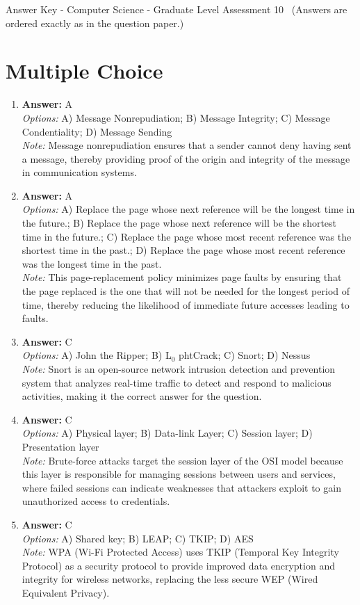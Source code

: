 \documentclass[12pt]{article}
\begin{document}
\begin{center}
Answer Key - Computer Science - Graduate Level Assessment 10 \
\small (Answers are ordered exactly as in the question paper.)
\end{center}

\section*{Multiple Choice}
\begin{enumerate}[label=\arabic*.]
\item \textbf{Answer:} A
\\ \textit{Options:} A) Message Nonrepudiation; B) Message Integrity; C) Message Condentiality; D) Message Sending
\\ \textit{Note:} Message nonrepudiation ensures that a sender cannot deny having sent a message, thereby providing proof of the origin and integrity of the message in communication systems.
\item \textbf{Answer:} A
\\ \textit{Options:} A) Replace the page whose next reference will be the longest time in the future.; B) Replace the page whose next reference will be the shortest time in the future.; C) Replace the page whose most recent reference was the shortest time in the past.; D) Replace the page whose most recent reference was the longest time in the past.
\\ \textit{Note:} This page-replacement policy minimizes page faults by ensuring that the page replaced is the one that will not be needed for the longest period of time, thereby reducing the likelihood of immediate future accesses leading to faults.
\item \textbf{Answer:} C
\\ \textit{Options:} A) John the Ripper; B) L$_{0}$ phtCrack; C) Snort; D) Nessus
\\ \textit{Note:} Snort is an open-source network intrusion detection and prevention system that analyzes real-time traffic to detect and respond to malicious activities, making it the correct answer for the question.
\item \textbf{Answer:} C
\\ \textit{Options:} A) Physical layer; B) Data-link Layer; C) Session layer; D) Presentation layer
\\ \textit{Note:} Brute-force attacks target the session layer of the OSI model because this layer is responsible for managing sessions between users and services, where failed sessions can indicate weaknesses that attackers exploit to gain unauthorized access to credentials.
\item \textbf{Answer:} C
\\ \textit{Options:} A) Shared key; B) LEAP; C) TKIP; D) AES
\\ \textit{Note:} WPA (Wi-Fi Protected Access) uses TKIP (Temporal Key Integrity Protocol) as a security protocol to provide improved data encryption and integrity for wireless networks, replacing the less secure WEP (Wired Equivalent Privacy).
\end{enumerate}
\end{document}
